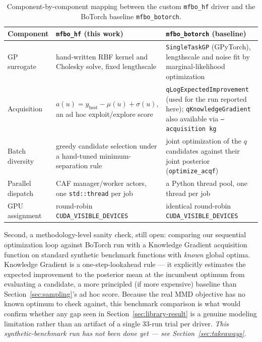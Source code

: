 \documentclass[11pt]{article}
\begin{document}
\begin{table}[htbp]
\centering
\begin{tabular}{p{3.1cm}p{5.3cm}p{5.3cm}}
\hline
\textbf{Component} & \textbf{\texttt{mfbo\_hf} (this work)} & \textbf{\texttt{mfbo\_botorch} (baseline)} \\
\hline
GP surrogate &
  hand-written RBF kernel and Cholesky solve, fixed lengthscale &
  \texttt{SingleTaskGP} (GPyTorch), lengthscale and noise fit by
  marginal-likelihood optimization \\[4pt]
Acquisition &
  $a(u) = y_{\text{best}} - \mu(u) + \sigma(u)$, an ad hoc
  exploit/explore score &
  \texttt{qLogExpectedImprovement} (used for the run reported here); \texttt{qKnowledgeGradient} also available via \texttt{--acquisition kg} \\[4pt]
Batch diversity &
  greedy candidate selection under a hand-tuned minimum-separation
  rule &
  joint optimization of the $q$ candidates against their joint
  posterior (\texttt{optimize\_acqf}) \\[4pt]
Parallel dispatch &
  CAF manager/worker actors, one \texttt{std::thread} per job &
  a Python thread pool, one thread per job \\[4pt]
GPU assignment &
  round-robin \texttt{CUDA\_VISIBLE\_DEVICES} &
  identical round-robin \texttt{CUDA\_VISIBLE\_DEVICES} \\
\hline
\end{tabular}
\caption{Component-by-component mapping between the custom
\texttt{mfbo\_hf} driver and the BoTorch baseline \texttt{mfbo\_botorch}.}
\label{tab:botorch-mapping}
\end{table}

Second, a methodology-level sanity check, still open: comparing our
sequential optimization loop against BoTorch run with a Knowledge
Gradient acquisition function on standard synthetic benchmark functions
with \emph{known} global optima. Knowledge Gradient is a one-step-lookahead
rule — it explicitly estimates the expected improvement to the posterior
mean at the incumbent optimum from evaluating a candidate, a more
principled (if more expensive) baseline than
Section~\ref{sec:sampling}'s ad hoc score. Because the real MMD objective
has no known optimum to check against, this benchmark comparison is what
would confirm whether any gap seen in Section~\ref{sec:library-result} is
a genuine modeling limitation rather than an artifact of a single 33-run
trial per driver. \emph{This synthetic-benchmark run has not been done
yet — see Section~\ref{sec:takeaways}.}
\end{document}
